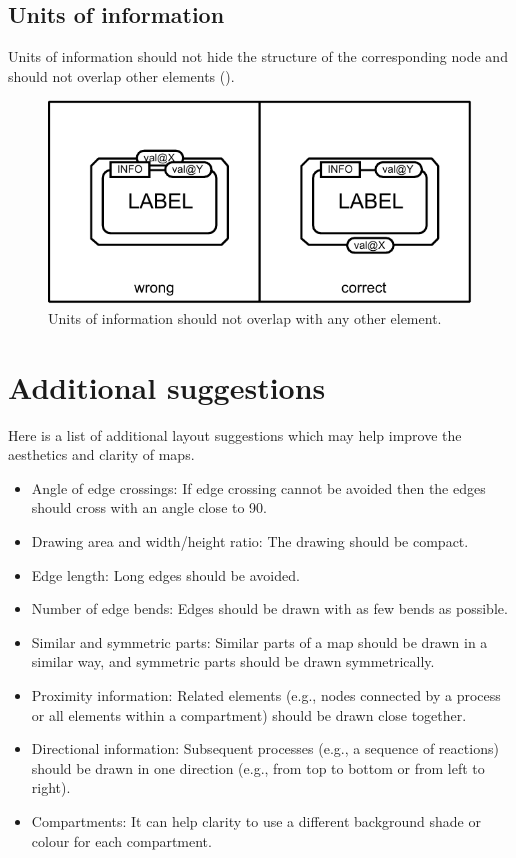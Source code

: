 \subsection{Units of information}

Units of information should not hide the structure of the
corresponding node and should not overlap other
elements ().

\begin{figure}[htb]
  \centering
  \includegraphics[scale=0.8]{images/build/layout_unit_information.pdf}
  \caption{Units of information should not overlap with any
  other element.}\label{fig:layout7}
\end{figure}

\section{Additional suggestions}
\label{sec:additional-suggestions}

Here is a list of additional layout suggestions which may help improve the aesthetics and clarity of \PD maps.

\begin{itemize}
  \item Angle of edge crossings: If edge crossing cannot be avoided then the edges should cross with an angle close to 90\degree.
 \item Drawing area and width/height ratio: The drawing should
  be compact.
  \item Edge length: Long edges should be avoided.
  \item Number of edge bends: Edges should be drawn with
  as few bends as possible.
  \item Similar and symmetric parts: Similar parts of a map
  should be drawn in a similar way, and symmetric parts
  should be drawn symmetrically.
  \item Proximity information: Related elements (e.g., nodes
  connected by a process or all elements within a compartment)
  should be drawn close together.
  \item Directional information: Subsequent processes (e.g., a sequence
  of reactions) should be drawn in one direction (e.g., from
  top to bottom or from left to right).
  \item Compartments: It can help clarity to use a different background shade or colour for each compartment.
\end{itemize}
